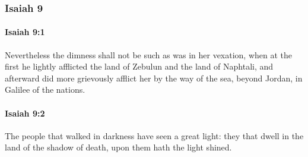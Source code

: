 	\subsubsection{Isaiah 9} %
		\label{ISAIAH-9}

		\paragraph{Isaiah 9:1} %
			\label{ISAIAH-9-1}

			Nevertheless the dimness shall not be such as was in her vexation, when at the first he lightly afflicted the land of Zebulun and the land of Naphtali, and afterward did more grievously afflict her by the way of the sea, beyond Jordan, in Galilee of the nations.


		\paragraph{Isaiah 9:2} %
			\label{ISAIAH-9-2}

			The people that walked in darkness have seen a great light: they that dwell in the land of the shadow of death, upon them hath the light shined.

